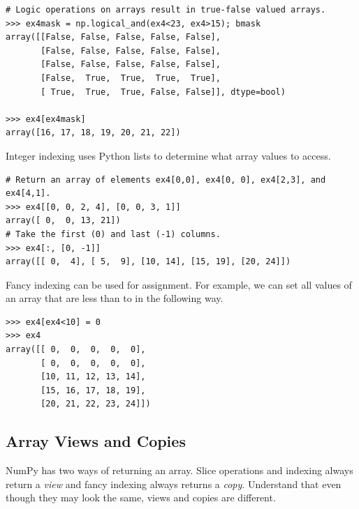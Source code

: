 \begin{lstlisting}
# Logic operations on arrays result in true-false valued arrays.
>>> ex4mask = np.logical_and(ex4<23, ex4>15); bmask 
array([[False, False, False, False, False],
       [False, False, False, False, False],
       [False, False, False, False, False],
       [False,  True,  True,  True,  True],
       [ True,  True,  True, False, False]], dtype=bool)

>>> ex4[ex4mask]
array([16, 17, 18, 19, 20, 21, 22])
\end{lstlisting}

Integer indexing uses Python lists to determine what array values to access.
\begin{lstlisting}
# Return an array of elements ex4[0,0], ex4[0, 0], ex4[2,3], and ex4[4,1].
>>> ex4[[0, 0, 2, 4], [0, 0, 3, 1]] 
array([ 0,  0, 13, 21])
# Take the first (0) and last (-1) columns.
>>> ex4[:, [0, -1]]  
array([[ 0,  4], [ 5,  9], [10, 14], [15, 19], [20, 24]])
\end{lstlisting}

Fancy indexing can
be used for assignment. For example, we can set all values of an array
that are less than  to  in the following way.
\begin{lstlisting} 
>>> ex4[ex4<10] = 0
>>> ex4
array([[ 0,  0,  0,  0,  0],
       [ 0,  0,  0,  0,  0],
       [10, 11, 12, 13, 14],
       [15, 16, 17, 18, 19],
       [20, 21, 22, 23, 24]])
\end{lstlisting}



% 


\subsection*{Array Views and Copies} 
NumPy has two ways of returning an array. Slice operations and indexing always return
a \emph{view} and fancy indexing always returns a \emph{copy}.
Understand that even though they may look the same, views and copies are different.


